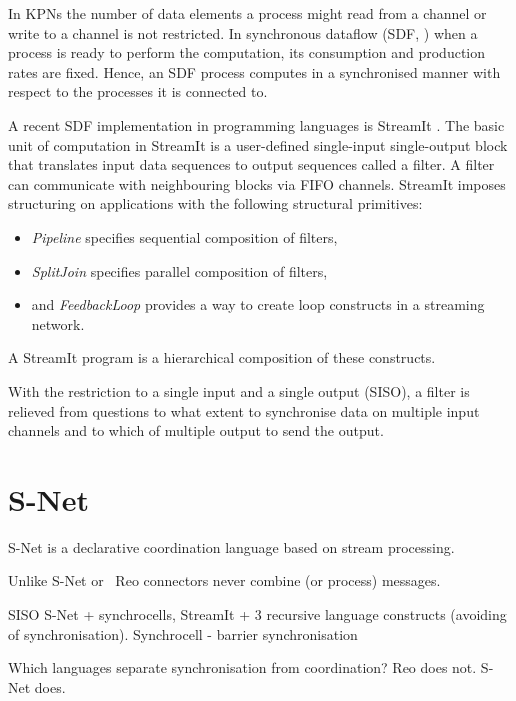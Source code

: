 In KPNs the number of data elements a process might read from a channel or write to a channel is not restricted. In synchronous dataflow (SDF, \cite{sdf}) when a process is ready to perform the computation, its consumption and production rates are fixed. Hence, an SDF process computes in a synchronised manner with respect to the processes it is connected to.

A recent SDF implementation in programming languages is StreamIt \cite{streamit}. The basic unit of computation in StreamIt is a user-defined single-input single-output block that translates input data sequences to output sequences called a filter. A filter can communicate with neighbouring blocks via FIFO channels. StreamIt imposes structuring on applications with the following structural primitives:
\begin{itemize}
\item \emph{Pipeline} specifies sequential composition of filters,
\item \emph{SplitJoin} specifies parallel composition of filters,
\item and \emph{FeedbackLoop} provides a way to create loop constructs in a streaming network.
\end{itemize}
A StreamIt program is a hierarchical composition of these constructs.

With the restriction to a single input and a single output (SISO), a filter is relieved from questions to what extent to synchronise data on multiple input channels and to which of multiple output to send the output.


    \section{S-Net}
S-Net \cite{snet_intro} is a declarative coordination language based on stream processing.





Unlike S-Net or \ak\, Reo connectors never combine (or process) messages.

SISO
S-Net + synchrocells, StreamIt + 3 recursive language constructs (avoiding of synchronisation).
Synchrocell - barrier synchronisation


Which languages separate synchronisation from coordination?
Reo does not.
S-Net does.
